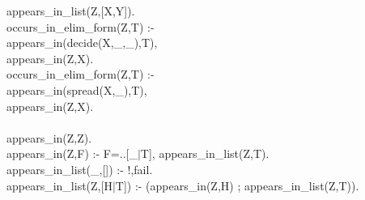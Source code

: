\documentclass[11pt]{report}
\begin{document}
\begin{sf}
\begin{tabbing}
\hspace{6em}appears\_\hspace{0.1em}in\_\hspace{0.1em}list(Z,[X,Y]).\\[-0.15ex]
occurs\_\hspace{0.1em}in\_\hspace{0.1em}elim\_\hspace{0.1em}form(Z,T) :- \\[-0.15ex]
\hspace{6em}appears\_\hspace{0.1em}in(decide(X,\_\hspace{0.1em},\_\hspace{0.1em}),T),\\[-0.15ex]
\hspace{6em}appears\_\hspace{0.1em}in(Z,X).\\[-0.15ex]
occurs\_\hspace{0.1em}in\_\hspace{0.1em}elim\_\hspace{0.1em}form(Z,T) :- \\[-0.15ex]
\hspace{6em}appears\_\hspace{0.1em}in(spread(X,\_\hspace{0.1em}),T),\\[-0.15ex]
\hspace{6em}appears\_\hspace{0.1em}in(Z,X).\\[-0.7ex]
\\[-0.15ex]
appears\_\hspace{0.1em}in(Z,Z).\\[-0.15ex]
appears\_\hspace{0.1em}in(Z,F) :- F=..[\_\hspace{0.1em}$\mid$T], appears\_\hspace{0.1em}in\_\hspace{0.1em}list(Z,T).\\[-0.15ex]
appears\_\hspace{0.1em}in\_\hspace{0.1em}list(\_\hspace{0.1em},[]) :- !,fail.\\[-0.15ex]
appears\_\hspace{0.1em}in\_\hspace{0.1em}list(Z,[H$\mid$T]) :- (appears\_\hspace{0.1em}in(Z,H) ; appears\_\hspace{0.1em}in\_\hspace{0.1em}list(Z,T)).\\[-0.7ex]
\\[-0.7ex]

\end{tabbing}\end{sf}
\end{document}
